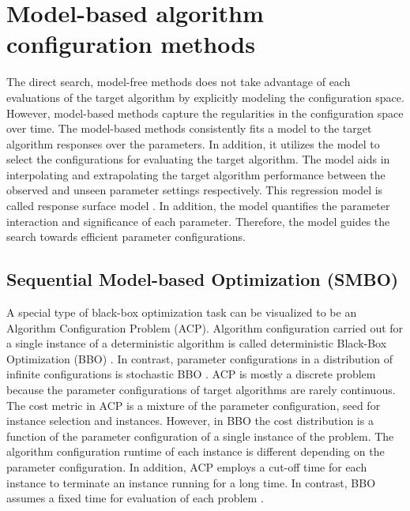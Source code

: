 \section{Model-based algorithm configuration methods}
\label{section:model-based}

The direct search, model-free methods does not take advantage of each evaluations of the target algorithm by explicitly modeling the configuration space. However, model-based methods capture the regularities in the configuration space over time. The model-based methods consistently fits a model to the target algorithm responses over the parameters. In addition, it utilizes the model to select the configurations for evaluating the target algorithm. The model aids in interpolating and extrapolating the target algorithm performance between the observed and unseen parameter settings respectively. This regression model is called response surface model \cite{AAC_Mainreview}. In addition, the model quantifies the parameter interaction and significance of each parameter. Therefore, the model guides the search towards efficient parameter configurations.

\subsection{Sequential Model-based Optimization (SMBO)}

A special type of black-box optimization task can be visualized to be an Algorithm Configuration Problem (ACP). Algorithm configuration carried out for a single instance of a deterministic algorithm is called deterministic Black-Box Optimization (BBO) \cite{Hutterphd}. In contrast, parameter configurations in a distribution of infinite configurations is stochastic BBO \cite{Hutterphd}. ACP is mostly a discrete problem because the parameter configurations of target algorithms are rarely continuous. The cost metric in ACP is a mixture of the parameter configuration, seed for instance selection and instances. However, in BBO the cost distribution is a function of the parameter configuration of a single instance of the problem. The algorithm configuration runtime of each instance is different depending on the parameter configuration. In addition, ACP employs a cut-off time for each instance to terminate an instance running for a long time. In contrast, BBO assumes a fixed time for evaluation of each problem \cite{Hutterphd}. 

